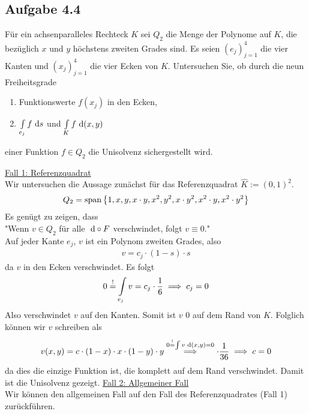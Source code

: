 \subsection{Aufgabe 4.4}
Für ein achsenparalleles Rechteck $K$ sei $Q_2$ die Menge der Polynome auf $K$, die bezüglich $x$ und $y$ höchstens zweiten Grades sind. 
Es seien $(e_j)_{j=1}^4$ die vier Kanten und $(x_j)_{j=1}^4$ die vier Ecken von $K$. 
Untersuchen Sie, ob durch die neun Freiheitsgrade
\begin{enumerate}[label=(\roman*)]
	\item Funktionswerte $f(x_j)$ in den Ecken,
	\item $\int\limits_{e_j} f\text{ d} s$ und $\int\limits_K f\text{ d}(x,y)$
\end{enumerate}
einer Funktion $f\in Q_2$ die Unisolvenz sichergestellt wird.

\begin{lösung}
	\underline{Fall 1: Referenzquadrat}\\
	Wir untersuchen die Aussage zunächst für das Referenzquadrat $\hat{K}:=(0,1)^2$.
	\begin{align*}
		Q_2=\operatorname{span}\left\lbrace 1,x,y,x\cdot y,x^2,y^2,x\cdot y^2,x^2\cdot y,x^2\cdot y^2\right\rbrace
	\end{align*}
	Es genügt zu zeigen, dass\\
	"Wenn $v\in Q_2$ für alle $\text{ d}\circ F$ verschwindet, folgt $v\equiv0$."\\
	Auf jeder Kante $e_j$, $v$ ist ein Polynom zweiten Grades, also
	\begin{align*}
		v=c_j\cdot(1-s)\cdot s
	\end{align*}
	da $v$ in den Ecken verschwindet. 
	Es folgt
	\begin{align*}
		0\stackrel{!}{=}\int\limits_{e_j} v=c_j\cdot\frac{1}{6}\implies c_j=0
	\end{align*}
	Also verschwindet $v$ auf den Kanten. 
	Somit ist $v$ 0 auf dem Rand von $K$. 
	Folglich können wir $v$ schreiben als
	\begin{align*}
		v(x,y)=c\cdot(1-x)\cdot x\cdot(1-y)\cdot y
		\stackrel{0\stackrel{!}{=}\int v\text{ d} (x,y)=0}{\implies}\cdot\frac{1}{36}\implies c=0
	\end{align*}
	da dies die einzige Funktion ist, die komplett auf dem Rand verschwindet. 
	Damit ist die Unisolvenz gezeigt.\nl
	\underline{Fall 2: Allgemeiner Fall}\\
	Wir können den allgemeinen Fall auf den Fall des Referenzquadrates (Fall 1) zurückführen.
\end{lösung}


